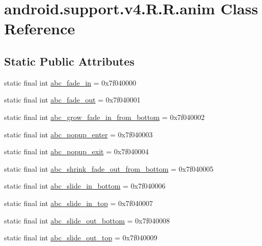 \hypertarget{classandroid_1_1support_1_1v4_1_1_r_1_1anim}{
\section{android.support.v4.R.R.anim Class Reference}
\label{classandroid_1_1support_1_1v4_1_1_r_1_1anim}
}
\subsection*{Static Public Attributes}
\begin{CompactItemize}
\item 
static final int \hyperlink{classandroid_1_1support_1_1v4_1_1_r_1_1anim_736d31a586a0a03b16a2f7355debf687}{abc\_\-fade\_\-in} = 0x7f040000
\item 
static final int \hyperlink{classandroid_1_1support_1_1v4_1_1_r_1_1anim_b9dab8fbba9150b337132581b1da69ef}{abc\_\-fade\_\-out} = 0x7f040001
\item 
static final int \hyperlink{classandroid_1_1support_1_1v4_1_1_r_1_1anim_f7b89aeeb7fe3fa3e042123a298d2a5b}{abc\_\-grow\_\-fade\_\-in\_\-from\_\-bottom} = 0x7f040002
\item 
static final int \hyperlink{classandroid_1_1support_1_1v4_1_1_r_1_1anim_a48473f7681d9a103407be05207b2809}{abc\_\-popup\_\-enter} = 0x7f040003
\item 
static final int \hyperlink{classandroid_1_1support_1_1v4_1_1_r_1_1anim_822317f72f8e2f6a6f9248ff5848ea8d}{abc\_\-popup\_\-exit} = 0x7f040004
\item 
static final int \hyperlink{classandroid_1_1support_1_1v4_1_1_r_1_1anim_8180eff7120a2d0be9208b4a3502f9fb}{abc\_\-shrink\_\-fade\_\-out\_\-from\_\-bottom} = 0x7f040005
\item 
static final int \hyperlink{classandroid_1_1support_1_1v4_1_1_r_1_1anim_723621ace64cd8b63b1810115f911f36}{abc\_\-slide\_\-in\_\-bottom} = 0x7f040006
\item 
static final int \hyperlink{classandroid_1_1support_1_1v4_1_1_r_1_1anim_c618fbbaa255a72fa712ff0af0053082}{abc\_\-slide\_\-in\_\-top} = 0x7f040007
\item 
static final int \hyperlink{classandroid_1_1support_1_1v4_1_1_r_1_1anim_dc9120f5905d0c662967fad6b35476c9}{abc\_\-slide\_\-out\_\-bottom} = 0x7f040008
\item 
static final int \hyperlink{classandroid_1_1support_1_1v4_1_1_r_1_1anim_774f78633c593374547ebfe41eea8d80}{abc\_\-slide\_\-out\_\-top} = 0x7f040009

\end{CompactItemize}
